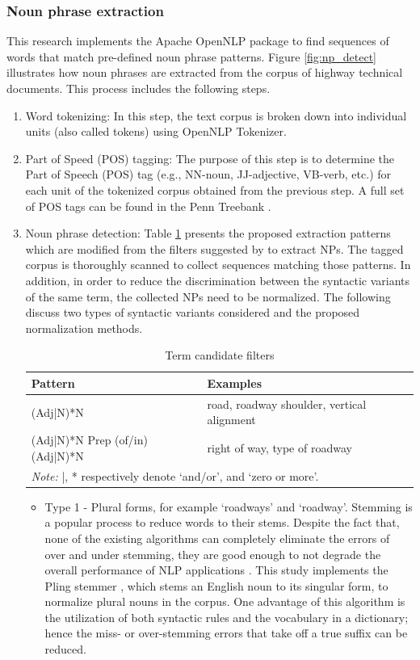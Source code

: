\documentclass[Journal, BackFigs,NoLists, DoubleSpace]{ascelike}%
\begin{document}
\subsubsection{Noun phrase extraction}
%
This research implements the Apache OpenNLP package to find sequences of words that match pre-defined noun phrase patterns. Figure \ref{fig:np_detect} illustrates how noun phrases are extracted from the corpus of highway technical documents. This process includes the following steps. %
%
\begin{enumerate} [label=\roman*]
\item Word tokenizing: In this step, the text corpus is broken down into individual units (also called tokens) using OpenNLP Tokenizer.
\item Part of Speed (POS) tagging: The purpose of this step is to determine the Part of Speech (POS) tag (e.g., NN-noun, JJ-adjective, VB-verb, etc.) for each unit of the tokenized corpus obtained from the previous step. A full set of POS tags can be found in the Penn Treebank \cite{marcus93}.
\item Noun phrase detection: Table \ref{table:term_filter} presents the proposed extraction patterns which are modified from the filters suggested by  to extract NPs. The tagged corpus is thoroughly scanned to collect sequences matching those patterns. 
In addition, in order to reduce the discrimination between the syntactic variants of the same term, the collected NPs need to be normalized. The following discuss two types of syntactic variants considered and the proposed normalization methods.
\begin{table} [t]
		\caption{Term candidate filters}
		\label{table:term_filter}
		\centering
		\small
		\renewcommand{\arraystretch}{1.25}
		\begin{tabular}{l l}
			\hline
			\textbf{Pattern} & \textbf{Examples}\\
			\hline
			(Adj|N)*N		& road, roadway shoulder, vertical alignment\\
			(Adj|N)*N Prep (of/in) (Adj|N)*N	&	right of way, type of roadway\\
			\hline
			\multicolumn{2}{l}{\textit{Note:} |, * respectively denote `and/or', and `zero or more'.  } \\
			\hline
		\end{tabular}
		\normalsize
\end{table}
\begin{itemize}
		\item Type 1 - Plural forms, for example `roadways' and `roadway'. Stemming is a popular process to reduce words to their stems. Despite the fact that, none of the existing algorithms can completely eliminate the errors of over and under stemming, they are good enough to not degrade the overall performance of NLP applications \cite{jivani2011stemmer}. This study implements the Pling stemmer \cite{suchanek2006stemmer}, which stems an English noun to its singular form, to normalize plural nouns in the corpus. One advantage of this algorithm is the utilization of both syntactic rules and the vocabulary in a dictionary; hence the miss- or over-stemming errors that take off a true suffix can be reduced. 

\end{itemize}
\end{enumerate}
\end{document}
